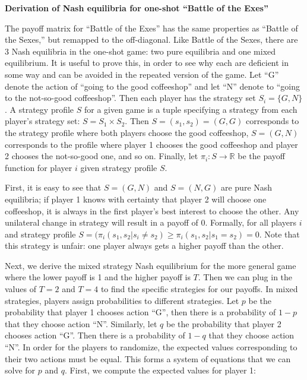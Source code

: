 \documentclass[11pt, oneside]{article}   	%
\begin{document}
\noindent\textbf{Derivation of Nash equilibria for one-shot ``Battle of the Exes''}


The payoff matrix for ``Battle of the Exes'' has the same properties as ``Battle of the Sexes,'' but remapped to the off-diagonal. Like Battle of the Sexes, there are 3 Nash equilibria in the one-shot game: two pure equilibria and one mixed equilibrium. It is useful to prove this, in order to see why each are deficient in some way and can be avoided in the repeated version of the game. Let ``G'' denote the action of ``going to the good coffeeshop'' and let ``N'' denote to ``going to the not-so-good coffeeshop''. Then each player has the strategy set $S_i = \{G, N\}$. A strategy profile $S$ for a given game is a tuple specifying a strategy from each player's strategy set: $S = S_1 \times S_2$. Then $S = (s_1, s_2) = (G, G)$ corresponds to the strategy profile where both players choose the good coffeeshop, $S = (G, N)$ corresponds to the profile where player 1 chooses the good coffeeshop and player 2 chooses the not-so-good one, and so on. Finally, let $\pi_i: S \rightarrow \mathbb{R}$ be the payoff function for player $i$ given strategy profile $S$. 

First, it is easy to see that $S = (G, N)$ and $S = (N, G)$ are pure Nash equilibria; if player 1 knows with certainty that player 2 will choose one coffeeshop, it is always in the first player's best interest to choose the other. Any unilateral change in strategy will result in a payoff of 0. Formally, for all players $i$ and strategy profile $S = ( \pi_i(s_1, s_2 | s_i \neq s_2) \ge \pi_i(s_1, s_2 | s_1 = s_2) = 0$. Note that this strategy is unfair: one player always gets a higher payoff than the other.

Next, we derive the mixed strategy Nash equilibrium for the more general game where the lower payoff is 1 and the higher payoff is $T$. Then we can plug in the values of $T = 2$ and $T = 4$ to find the specific strategies for our payoffs. In mixed strategies, players assign probabilities to different strategies. Let $p$ be the probability that player 1 chooses action ``G'', then there is a probability of $1-p$ that they choose action ``N''. Similarly, let $q$ be the probability that player 2 chooses action ``G''. Then there is a probability of $1-q$ that they choose action ``N''. In order for the players to randomize, the expected values corresponding to their two actions must be equal. This forms a system of equations that we can solve for $p$ and $q$. First, we compute the expected values for player 1:
\end{document}

